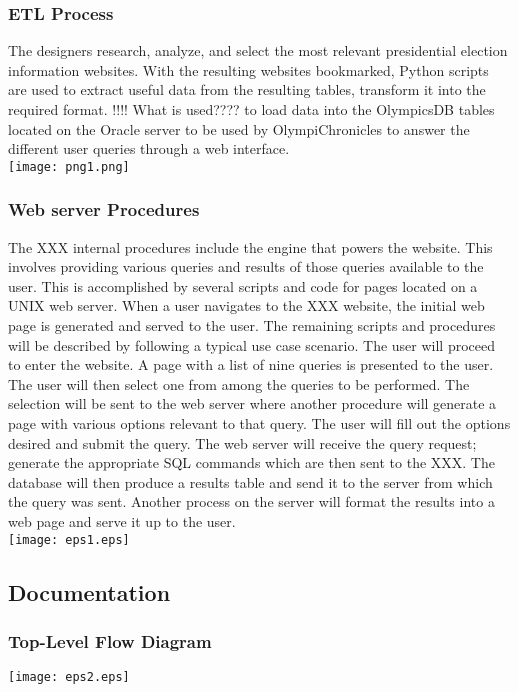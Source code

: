 \documentclass{article}
\begin{document}
\subsubsection{ETL Process}
The designers research, analyze, and select the most relevant presidential election information websites. With the resulting websites bookmarked, Python scripts are used to extract useful data from the resulting tables, transform it into the required format. !!!! What is used???? to load data into the OlympicsDB tables located on the Oracle server to be used by OlympiChronicles to answer the different user queries through a web interface.\\
\texttt{[image: png1.png]}

\subsubsection{Web server Procedures}
The XXX internal procedures include the engine that powers the website. This involves providing various queries and results of those queries available to the user. This is accomplished by several scripts and code for pages located on a UNIX web server. When a user navigates to the XXX website, the initial web page is generated and served to the user. The remaining scripts and procedures will be described by following a typical use case scenario. The user will proceed to enter the website. A page with a list of nine queries is presented to the user. The user will then select one from among the queries to be performed. The selection will be sent to the web server where another procedure will generate a page with various options relevant to that query. The user will fill out the options desired and submit the query. The web server will receive the query request; generate the appropriate SQL commands which are then sent to the XXX. The database will then produce a results table and send it to the server from which the query was sent. Another process on the server will format the results into a web page and serve it up to the user.\\
\texttt{[image: eps1.eps]}


\subsection{Documentation}


\subsubsection{Top-Level Flow Diagram}
\texttt{[image: eps2.eps]}
\end{document}
